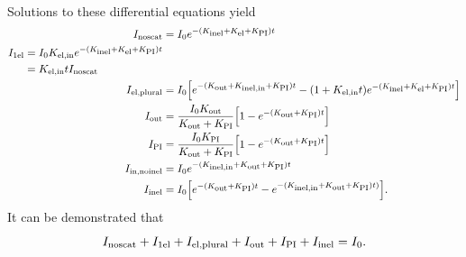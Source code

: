 \documentclass[]{article}
\newcommand\nt{\textup{\scriptsize{0}}}
\newcommand\el{\textup{\scriptsize{el}}}
\newcommand\inel{\textup{\scriptsize{inel}}}
\newcommand\elin{\textup{\scriptsize{el,in}}}
\newcommand\inelin{\textup{\scriptsize{inel,in}}}
\newcommand\out{\textup{\scriptsize{out}}}
\newcommand\PI{\textup{\scriptsize{PI}}}
\newcommand\noscat{\textup{\scriptsize{noscat}}}
\newcommand\sel{\textup{\scriptsize{1el}}}
\newcommand\elpl{\textup{\scriptsize{el,plural}}}
\newcommand\innoinel{\textup{\scriptsize{in,noinel}}}
\begin{document}
\paragraph{} Solutions to these differential equations yield
\begin{align}
I_{\noscat} &= I_{\nt}e^{-(K_{\inel}+K_{\el}+K_{\PI})t}
\label{x1} \\
\begin{split}
\label{x2}
I_{\sel} &= I_{\nt}K_{\elin}e^{-(K_{\inel}+K_{\el}+K_{\PI})t} \\
	&= K_{\elin}tI_{\noscat}
\end{split} \\
I_{\elpl} &= I_{\nt} \Big[ e^{-(K_{\out}+K_{\inelin}+K_{\PI})t} - (1+K_{\elin}t)e^{-(K_{\inel}+K_{\el}+K_{\PI})t} \Big]
\label{x3} \\
I_{\out} &= \frac{I_{\nt}K_{\out}}{K_{\out}+K_{\PI}} \Big[1 - e^{-(K_{\out}+K_{\PI})t}\Big]
\label{x4} \\
I_{\PI} &= \frac{I_{\nt}K_{\PI}}{K_{\out}+K_{\PI}} \Big[1 - e^{-(K_{\out}+K_{\PI})t}\Big]
\label{x5} \\
I_{\innoinel} &= I_{\nt}e^{-(K_{\inelin}+K_{\out}+K_{\PI})t}
\label{x6} \\
I_{\inel} &= I_{\nt}\Big[e^{-(K_{\out}+K_{\PI})t} - e^{-(K_{\inelin}+K_{\out}+K_{\PI})t)}\Big].
\label{x7}
\end{align}
It can be demonstrated that
\begin{equation}
I_{\noscat} + I_{\sel} + I_{\elpl} + I_{\out} + I_{\PI} + I_{\inel} = I_{\nt}.
\end{equation}
\end{document}
